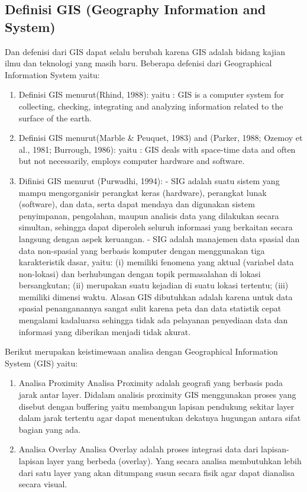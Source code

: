 \subsection{Definisi GIS (Geography Information and System)}
Dan defenisi dari GIS dapat selalu berubah karena GIS adalah bidang kajian ilmu 
dan teknologi yang masih baru. Beberapa defenisi dari Geographical Information System yaitu:
\begin{enumerate}
\item Definisi GIS menurut(Rhind, 1988):
yaitu : GIS is a computer system for collecting, checking, integrating and analyzing
information related to the surface of the earth.

\item Definisi GIS menurut(Marble \& Peuquet, 1983) and (Parker,
1988; Ozemoy et al., 1981; Burrough, 1986):
yaitu : GIS deals with space-time data and often but not necessarily, employs computer
hardware and software.

\item Difinisi GIS menurut (Purwadhi, 1994):
- SIG adalah suatu sistem yang mampu mengorganisir perangkat keras (hardware),
perangkat lunak (software), dan data, serta dapat mendaya dan digunakan sistem
penyimpanan, pengolahan, maupun analisis data yang dilakukan secara simultan, sehingga dapat
diperoleh seluruh informasi yang berkaitan secara langsung dengan aspek keruangan.
- SIG adalah manajemen data spasial dan data non-spasial yang berbasis komputer
dengan menggunakan tiga karakteristik dasar, yaitu: 
(i) memiliki fenomena yang aktual (variabel data non-lokasi) dan berhubungan 
dengan topik permasalahan di lokasi bersangkutan; 
(ii) merupakan suatu kejadian di suatu lokasi tertentu; 
(iii) memiliki dimensi waktu. Alasan GIS dibutuhkan adalah karena untuk data spasial 
penanganannya sangat sulit karena peta dan data statistik cepat mengalami kadaluarsa 
sehingga tidak ada pelayanan penyediaan data dan informasi yang diberikan menjadi tidak akurat.
\end{enumerate} 

Berikut merupakan keistimewaan analisa dengan Geographical Information System (GIS) yaitu:
\begin{enumerate}
\item Analisa Proximity
Analisa Proximity adalah geografi yang berbasis pada jarak antar layer.
Didalam analisis proximity GIS menggunakan proses yang disebut dengan buffering
yaitu membangun lapisan pendukung sekitar layer dalam jarak tertentu agar dapat menentukan
dekatnya hugungan antara sifat bagian yang ada.
\item Analisa Overlay
Analisa Overlay adalah proses integrasi data dari lapisan-lapisan layer yang berbeda (overlay).
Yang secara analisa membutuhkan lebih dari satu layer yang akan ditumpang susun secara
fisik agar dapat dianalisa secara visual.
\end{enumerate}

